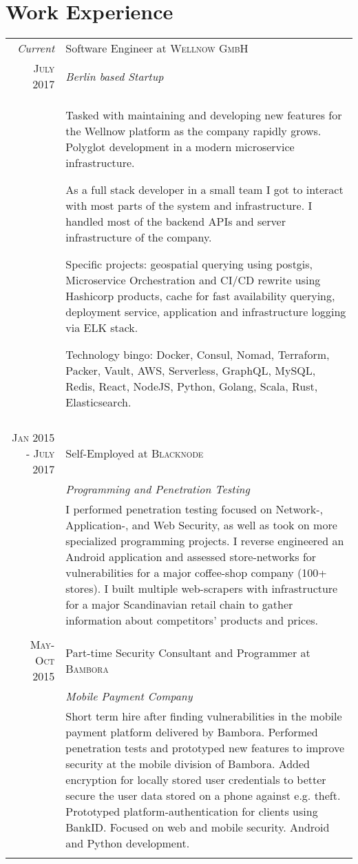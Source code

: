 \documentclass[a4paper,10pt]{article}
\begin{document}
\section{Work Experience}
\begin{tabular}{r|p{11cm}}
 \emph{Current} & Software Engineer at \textsc{Wellnow GmbH} \\
 \textsc{July 2017}&\emph{Berlin based Startup}\\
 &\footnotesize{
 Tasked with maintaining and developing new features for the Wellnow platform as the company rapidly grows. 
 Polyglot development in a modern microservice infrastructure. 

 As a full stack developer in a small team I got to interact with most parts of the system and infrastructure. I handled most of the backend APIs
 and server infrastructure of the company.
 
 Specific projects: geospatial querying using postgis, Microservice Orchestration and CI/CD rewrite using Hashicorp products, 
 cache for fast availability querying, deployment service, application and infrastructure logging via ELK stack.
 
 Technology bingo: Docker, Consul, Nomad, Terraform, Packer, Vault, AWS, Serverless, GraphQL, MySQL, 
 Redis, React, NodeJS, Python, Golang, Scala, Rust, Elasticsearch.}\\ \multicolumn{2}{c}{} \\

 \textsc{Jan 2015 - July 2017} & Self-Employed at \textsc{Blacknode} \\
 &\emph{Programming and Penetration Testing}\\
 &\footnotesize{I performed penetration testing focused on Network-, Application-, and Web Security, as well as took
 on more specialized programming projects. I reverse engineered an Android application and assessed store-networks
 for vulnerabilities for a major coffee-shop company (100+ stores). I built multiple web-scrapers with infrastructure 
 for a major Scandinavian retail chain to gather information about competitors' products and prices.}\\\multicolumn{2}{c}{} \\
 
 \textsc{May-Oct 2015} & Part-time Security Consultant and Programmer at \textsc{Bambora}\\
 &\emph{Mobile Payment Company}\\&\footnotesize{Short term hire after finding vulnerabilities in the 
 mobile payment platform delivered by Bambora. Performed penetration tests and prototyped new 
 features to improve security at the mobile division of Bambora. Added encryption for locally stored 
 user credentials to better secure the user data stored on a phone against e.g. theft. Prototyped 
 platform-authentication for clients using BankID. Focused on web and mobile security. 
 Android and Python development.}\\\multicolumn{2}{c}{} \\
 

\end{tabular}
\end{document}
